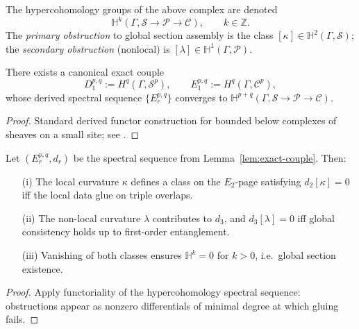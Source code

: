 \begin{definition}\label{def:cohomology}
The hypercohomology groups of the above complex are denoted
\[
\mathbb H^k(\Gamma,\mathcal S\!\to\!\mathcal P\!\to\!\mathcal C),\qquad k\in\mathbb Z.
\]
The \emph{primary obstruction} to global section assembly is the class 
$[\kappa]\in \mathbb H^2(\Gamma,\mathcal S)$; the \emph{secondary obstruction} (nonlocal) is $[\lambda]\in \mathbb H^1(\Gamma,\mathcal P)$.
\end{definition}

\begin{lemma}\label{lem:exact-couple}
There exists a canonical exact couple
\[
D^{p,q}_1:=H^q(\Gamma,\mathcal S^p), \qquad
E^{p,q}_1:=H^q(\Gamma,\mathcal C^p),
\]
whose derived spectral sequence $\{E_r^{p,q}\}$ converges to $\mathbb H^{p+q}(\Gamma,\mathcal S\!\to\!\mathcal P\!\to\!\mathcal C)$.
\end{lemma}

\begin{proof}
Standard derived functor construction for bounded below complexes of sheaves on a small site; see \cite{Verdier1967,Godement1958}. \relax
\end{proof}

\begin{theorem}\label{thm:obstruction-criterion}
Let $(E_r^{p,q},d_r)$ be the spectral sequence from Lemma~\ref{lem:exact-couple}. 
Then:
\begin{enumerate}
  \item[(i)] The local curvature $\kappa$ defines a class on the $E_2$-page satisfying $d_2[\kappa]=0$ iff the local data glue on triple overlaps.
  \item[(ii)] The non-local curvature $\lambda$ contributes to $d_3$, and $d_3[\lambda]=0$ iff global consistency holds up to first-order entanglement.
  \item[(iii)] Vanishing of both classes ensures $\mathbb H^k=0$ for $k>0$, i.e.\ global section existence.
\end{enumerate}
\end{theorem}

\begin{proof}
Apply functoriality of the hypercohomology spectral sequence: obstructions appear as nonzero differentials of minimal degree at which gluing fails. \relax
\end{proof}


